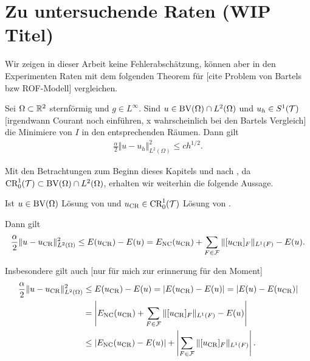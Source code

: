 \section{Zu untersuchende Raten (WIP Titel)}
Wir zeigen in dieser Arbeit keine Fehlerabschätzung, können aber in den 
Experimenten Raten mit dem folgenden Theorem für
[cite Problem von Bartels bzw ROF-Modell] vergleichen.
\begin{theorem}
  \label{thm:errorEstimateCourant}
  Sei $\Omega\subset\mathbb{R}^2$ sternförmig und $g\in L^\infty$.
  Sind $u\in\textup{BV}(\Omega)\cap L^2(\Omega)$ und $u_h\in S^1(\mathcal{T})$ [irgendwann
  Courant noch einführen, x wahrscheinlich bei den Bartels Vergleich] die 
  Minimiere von $I$ in den entsprechenden Räumen.
  Dann gilt 
  \begin{align*}
    \frac{\alpha}{2}\Vert u-u_h\Vert^2_{L^2(\Omega)}\leq
    ch^{1/2}.
  \end{align*}
\end{theorem}

Mit den Betrachtungen zum Beginn dieses Kapitels und nach 
, da $\textup{CR}^1_0(\mathcal{T})\subset\textup{BV}(\Omega)\cap L^2(\Omega)$,
erhalten wir weiterhin die folgende Aussage.

\begin{corollary}
  Ist $u\in\textup{BV}(\Omega)$ Lösung von  und
  $u_\textup{CR}\in\textup{CR}^1_0(\mathcal{T})$ Lösung von .

  Dann gilt
  \begin{align*}
    \frac{\alpha}{2}\Vert u-u_\textup{CR}\Vert^2_{L^2(\Omega)}\leq
    E(u_\textup{CR})-E(u)=E_\textup{NC}(u_\textup{CR})+\sum_{F\in\mathcal{F}}\Vert[u_\textup{CR}]_F\Vert_{L^1(F)}-E(u).
  \end{align*}

  Insbesondere gilt auch  [nur für mich zur erinnerung für den Moment]
  \begin{align*}
    \frac{\alpha}{2}\Vert u-u_\textup{CR}\Vert^2_{L^2(\Omega)}&\leq
    E(u_\textup{CR})-E(u)=
    |E(u_\textup{CR})-E(u)|=
    |E(u)-E(u_\textup{CR})|\\
    &=\left|E_\textup{NC}(u_\textup{CR})+\sum_{F\in\mathcal{F}}\Vert[u_\textup{CR}]_F\Vert_{L^1(F)}-E(u)\right|\\
    &\leq
    \left|E_\textup{NC}(u_\textup{CR})-E(u)\right|+
    \left|\sum_{F\in\mathcal{F}}\Vert[u_\textup{CR}]_F\Vert_{L^1(F)}\right|.
  \end{align*}
\end{corollary}


